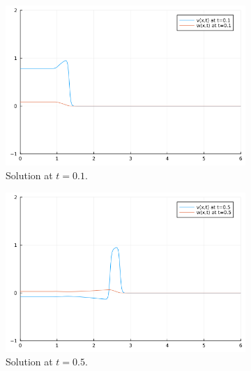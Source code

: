 \documentclass[12pt]{report}
\begin{document}
\begin{solution}
\begin{figure}[H]
    \begin{subfigure}[b]{0.45\linewidth}
        \centering
        \includegraphics[width=\linewidth]{images/4-1.png}
        \caption{Solution at $t=0.1$.}
        \label{4sol:a}
        \vspace{4ex}
    \end{subfigure}%
    \begin{subfigure}[b]{0.45\linewidth}
        \centering
        \includegraphics[width=\linewidth]{images/4-2.png}
        \caption{Solution at $t=0.5$.}
        \label{4sol:b}
        \vspace{4ex}
    \end{subfigure}
    \begin{subfigure}[b]{0.45\linewidth}
        \centering

\end{subfigure}
\end{figure}
\end{solution}
\end{document}
